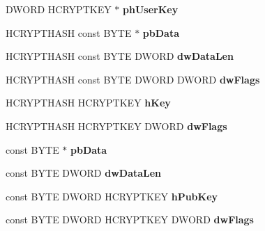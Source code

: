 \begin{DoxyCompactItemize}
D\+W\+O\+RD H\+C\+R\+Y\+P\+T\+K\+EY $\ast$ {\bfseries ph\+User\+Key}
\item 
\mbox{\label{structtag_p_r_o_v_f_u_n_c_s_a20c6b5475f74c9160ca0acbdfed0fd0f}} 
H\+C\+R\+Y\+P\+T\+H\+A\+SH const B\+Y\+TE $\ast$ {\bfseries pb\+Data}
\item 
\mbox{\label{structtag_p_r_o_v_f_u_n_c_s_a38a3f82f84568261c86b79d3c5b275c0}} 
H\+C\+R\+Y\+P\+T\+H\+A\+SH const B\+Y\+TE D\+W\+O\+RD {\bfseries dw\+Data\+Len}
\item 
\mbox{\label{structtag_p_r_o_v_f_u_n_c_s_ab904a6365723501f0078edd8dbcc5d85}} 
H\+C\+R\+Y\+P\+T\+H\+A\+SH const B\+Y\+TE D\+W\+O\+RD D\+W\+O\+RD {\bfseries dw\+Flags}
\item 
\mbox{\label{structtag_p_r_o_v_f_u_n_c_s_a6bcfdc807627ead861312135de094f1a}} 
H\+C\+R\+Y\+P\+T\+H\+A\+SH H\+C\+R\+Y\+P\+T\+K\+EY {\bfseries h\+Key}
\item 
\mbox{\label{structtag_p_r_o_v_f_u_n_c_s_aa7c5b28cfcb5b25d2d23647f1d4b2684}} 
H\+C\+R\+Y\+P\+T\+H\+A\+SH H\+C\+R\+Y\+P\+T\+K\+EY D\+W\+O\+RD {\bfseries dw\+Flags}
\item 
\mbox{\label{structtag_p_r_o_v_f_u_n_c_s_a55d9e6595a190584fd598dc63e7d1fe3}} 
const B\+Y\+TE $\ast$ {\bfseries pb\+Data}
\item 
\mbox{\label{structtag_p_r_o_v_f_u_n_c_s_a1c318b81ad0db9361e93b8f7136f6c8e}} 
const B\+Y\+TE D\+W\+O\+RD {\bfseries dw\+Data\+Len}
\item 
\mbox{\label{structtag_p_r_o_v_f_u_n_c_s_a6f0b9e7c82a6c09a7a45ff40d13206c5}} 
const B\+Y\+TE D\+W\+O\+RD H\+C\+R\+Y\+P\+T\+K\+EY {\bfseries h\+Pub\+Key}
\item 
\mbox{\label{structtag_p_r_o_v_f_u_n_c_s_a804cd1dd7004cababb6cf7ddac10d52a}} 
const B\+Y\+TE D\+W\+O\+RD H\+C\+R\+Y\+P\+T\+K\+EY D\+W\+O\+RD {\bfseries dw\+Flags}
\item 
\mbox{\label{structtag_p_r_o_v_f_u_n_c_s_a6e374e56c00d4c2578d1ff0cf00fddb7}} 

\end{DoxyCompactItemize}
